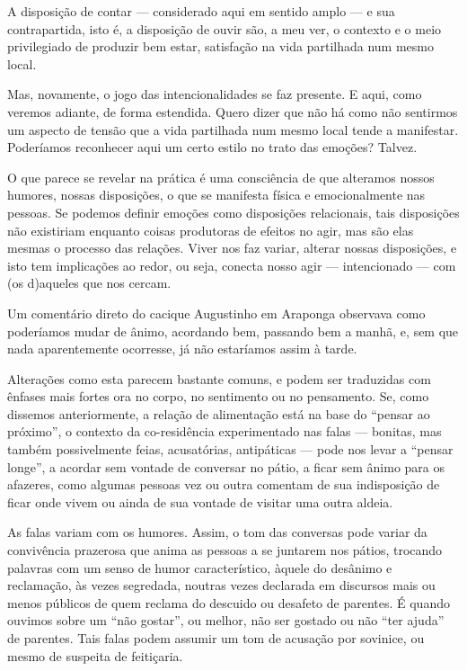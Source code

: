 A disposição de contar --- considerado aqui em sentido amplo --- e sua
contrapartida, isto é, a disposição de ouvir são, a meu ver, o contexto
e o meio privilegiado de produzir bem estar, satisfação na vida
partilhada num mesmo local.

Mas, novamente, o jogo das intencionalidades se faz presente. E aqui, como
veremos adiante, de forma estendida. Quero dizer que não há como não
sentirmos um aspecto de tensão que a vida partilhada num mesmo local
tende a manifestar. Poderíamos reconhecer aqui um certo estilo no trato
das emoções? Talvez.

O que parece se revelar na prática é uma consciência de que alteramos
nossos humores, nossas disposições, o que se manifesta física e
emocionalmente nas pessoas. Se podemos definir emoções como disposições
relacionais, tais disposições não existiriam enquanto coisas produtoras
de efeitos no agir, mas são elas mesmas o processo das relações. Viver
nos faz variar, alterar nossas disposições, e isto tem implicações ao
redor, ou seja, conecta nosso agir --- intencionado --- com (os d)aqueles
que nos cercam. 

Um comentário direto do cacique Augustinho em Araponga observava como
poderíamos mudar de ânimo, acordando bem, passando bem a manhã, e, sem
que nada aparentemente ocorresse, já não estaríamos assim à tarde.

Alterações como esta parecem bastante comuns, e podem ser traduzidas com
ênfases mais fortes ora no corpo, no sentimento ou no pensamento. Se,
como dissemos anteriormente, a relação de alimentação está na base do
``pensar ao próximo'', o contexto da co-residência experimentado nas
falas --- bonitas, mas também possivelmente feias, acusatórias,
antipáticas --- pode nos levar a ``pensar longe'', a acordar sem vontade de
conversar no pátio, a ficar sem ânimo para os afazeres, como
algumas pessoas vez ou outra comentam de sua indisposição de ficar onde
vivem ou ainda de sua vontade de visitar uma outra aldeia.

As falas variam com os humores. Assim, o tom das conversas pode variar
da convivência prazerosa que anima as pessoas a se juntarem nos pátios,
trocando palavras com um senso de humor característico, àquele do
desânimo e reclamação, às vezes segredada, noutras vezes declarada em
discursos mais ou menos públicos de quem reclama do descuido ou
desafeto de parentes. É quando ouvimos sobre um ``não gostar'', ou
melhor, não ser gostado ou não ``ter ajuda'' de parentes. Tais falas
podem assumir um tom de acusação por sovinice, ou mesmo de suspeita de
feitiçaria.

